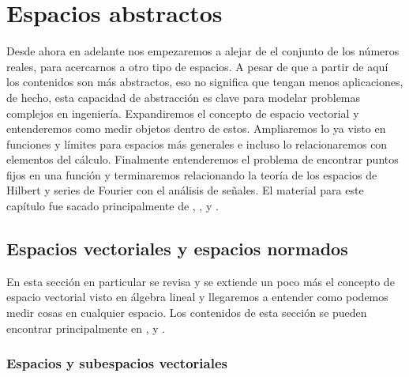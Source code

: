 \documentclass[12pt]{book}
\begin{document}
\chapter{Espacios abstractos}\label{cap:4}
\noindent
Desde ahora en adelante nos empezaremos a alejar de el conjunto de los números reales, para  acercarnos a otro tipo de espacios. A pesar de que a partir de aquí los contenidos son más abstractos, eso no significa que tengan menos aplicaciones, de hecho, esta capacidad de abstracción es clave para modelar problemas complejos en ingeniería. Expandiremos el concepto de espacio vectorial y entenderemos como medir objetos dentro de estos. Ampliaremos lo ya visto en funciones y límites para espacios más generales e incluso lo relacionaremos con elementos del cálculo. Finalmente entenderemos el problema de encontrar puntos fijos en una función y terminaremos relacionando la teoría de los espacios de Hilbert y series de Fourier con el análisis de señales. El material para este capítulo fue sacado principalmente de \cite{lay2007algebra}, \cite{kreyszig1991introductory}, \cite{kreyszig2007advanced} y \cite{Tao2016-qy}.

\section{Espacios vectoriales y espacios normados}
\noindent
 En esta sección en particular se revisa y se extiende un poco más el concepto de espacio vectorial visto en álgebra lineal y llegaremos a entender como podemos medir cosas en cualquier espacio. Los contenidos de esta sección se pueden encontrar principalmente en \cite[Capítulo 4, Sección 4.1]{lay2007algebra}, \cite[Chapter 2, Section 2.1]{kreyszig1991introductory} y \cite[Chapter 2, Section 2.2]{kreyszig1991introductory}.

\subsection{Espacios y subespacios vectoriales}
\end{document}
